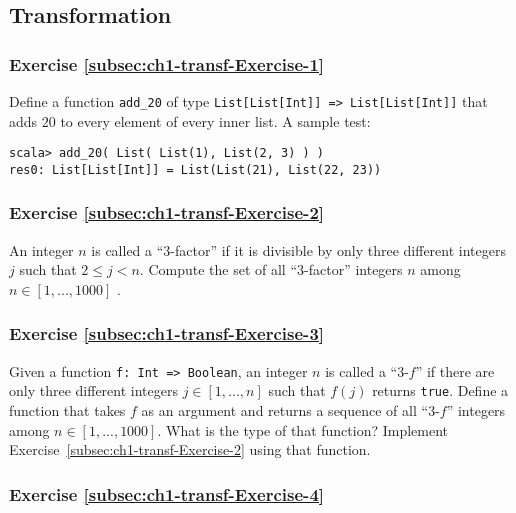 \subsection{Transformation}

\subsubsection{Exercise \label{subsec:ch1-transf-Exercise-1}\ref{subsec:ch1-transf-Exercise-1}}

Define a function \texttt{}\lstinline!add_20! of type \texttt{}\lstinline!List[List[Int]] => List[List[Int]]!
that adds $20$ to every element of every inner list. A sample test:
\begin{lstlisting}
scala> add_20( List( List(1), List(2, 3) ) )
res0: List[List[Int]] = List(List(21), List(22, 23))
\end{lstlisting}


\subsubsection{Exercise \label{subsec:ch1-transf-Exercise-2}\ref{subsec:ch1-transf-Exercise-2}}

An integer $n$ is called a \textsf{``}$3$-factor\textsf{''} if it is divisible by
only three different integers $j$ such that $2\leq j<n$. Compute
the set of all \textsf{``}$3$-factor\textsf{''} integers $n$ among $n\in[1,...,1000]$
.

\subsubsection{Exercise \label{subsec:ch1-transf-Exercise-3}\ref{subsec:ch1-transf-Exercise-3}}

Given a function \lstinline!f: Int => Boolean!, an integer $n$ is
called a \textsf{``}$3$-$f$\textsf{''} if there are only three different integers
$j\in[1,...,n]$ such that $f(j)$ returns \lstinline!true!. Define
a function that takes $f$ as an argument and returns a sequence of
all \textsf{``}$3$-$f$\textsf{''} integers among $n\in[1,...,1000]$. What is the
type of that function? Implement Exercise~\ref{subsec:ch1-transf-Exercise-2}
using that function.

\subsubsection{Exercise \label{subsec:ch1-transf-Exercise-4}\ref{subsec:ch1-transf-Exercise-4}}

